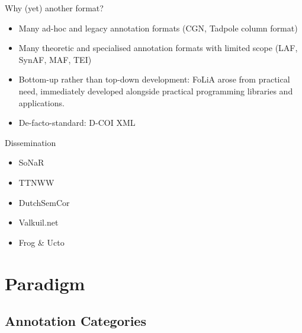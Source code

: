 \documentclass[compress,10pt]{beamer}
\begin{document}
\begin{frame}
	\begin{block}{Why (yet) another format?}
		\begin{itemize}
			\item Many ad-hoc and legacy annotation formats (CGN, Tadpole column format)
			\item Many theoretic and specialised annotation formats with limited scope (LAF, SynAF, MAF, TEI)
			\item Bottom-up rather than top-down development: FoLiA arose from practical need, immediately developed alongside practical programming libraries and applications. 
			\item De-facto-standard: D-COI XML
		\end{itemize}
	\end{block}
	
	\begin{block}{Dissemination}
		\begin{itemize}	
			\item SoNaR
			\item TTNWW
			\item DutchSemCor
			\item Valkuil.net
			\item Frog \& Ucto
		\end{itemize}			
	\end{block}

\end{frame}
   
       
\section{Paradigm}

\subsection{Annotation Categories}
\end{document}
